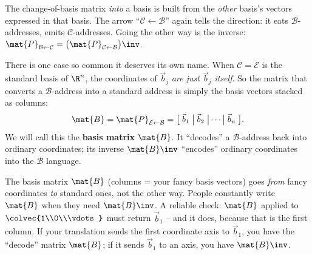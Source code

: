 \begin{focusbox}
The change-of-basis matrix \emph{into} a basis is built from the \emph{other}
basis's vectors expressed in that basis. The arrow ``$\mathcal{C}\leftarrow\mathcal{B}$''
again tells the direction: it eats $\mathcal{B}$-addresses, emits
$\mathcal{C}$-addresses. Going the other way is the inverse:
$\mat{P}_{\mathcal{B}\leftarrow\mathcal{C}}=\big(\mat{P}_{\mathcal{C}\leftarrow\mathcal{B}}\big)\inv$.
\end{focusbox}

There is one case so common it deserves its own name. When $\mathcal{C}=\mathcal{E}$
is the standard basis of $\R^n$, the coordinates of $\vec{b}_j$ \emph{are just
$\vec{b}_j$ itself}. So the matrix that converts a $\mathcal{B}$-address into a
standard address is simply the basis vectors stacked as columns:
\[
  \mat{B} = \mat{P}_{\mathcal{E}\leftarrow\mathcal{B}}
  = \big[\;\vec{b}_1\;\big|\;\vec{b}_2\;\big|\cdots\big|\;\vec{b}_n\;\big].
\]
We will call this the \textbf{basis matrix} $\mat{B}$. It ``decodes'' a
$\mathcal{B}$-address back into ordinary coordinates; its inverse $\mat{B}\inv$
``encodes'' ordinary coordinates into the $\mathcal{B}$ language.

\begin{trapbox}
The basis matrix $\mat{B}$ (columns = your fancy basis vectors) goes \emph{from}
fancy coordinates \emph{to} standard ones, not the other way. People constantly
write $\mat{B}$ when they need $\mat{B}\inv$. A reliable check: $\mat{B}$ applied
to $\colvec{1\\0\\\vdots}$ must return $\vec{b}_1$ -- and it does, because that is
the first column. If your translation sends the first coordinate axis to $\vec{b}_1$,
you have the ``decode'' matrix $\mat{B}$; if it sends $\vec{b}_1$ to an axis, you
have $\mat{B}\inv$.
\end{trapbox}


